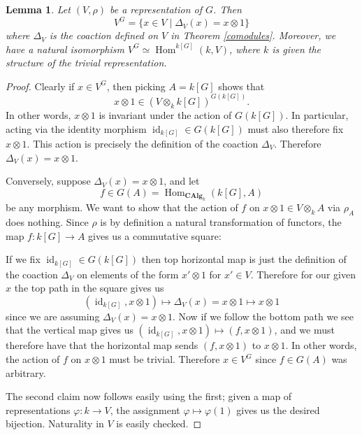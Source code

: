 \documentclass{article}
\theoremstyle{plain}
\newtheorem{Lemma}[Th]{Lemma}
\theoremstyle{definition}
\DeclareMathOperator{\id}{id}
\DeclareMathOperator{\Hom}{Hom}
\begin{document}
\begin{Lemma}\label{lemma:invariants-coinvariants}
    Let $(V, \rho)$ be a representation of $G$. Then 
    \[
    V^G=\{x\in V \mid \Delta_V(x)=x\otimes 1\}
    \]
    where $\Delta_V$ is the coaction defined on $V$ in Theorem \ref{comodules}. Moreover,  we have a natural isomorphism $V^G\simeq\Hom^{k[G]}(k, V)$, where $k$ is given the structure of the trivial representation.
\end{Lemma}
\begin{proof}
    Clearly if $x\in V^G$, then picking $A=k[G]$ shows that 
    \[
    x\otimes 1 \in (V\otimes_k k[G])^{G(k[G])}.
    \]
    In other words,  $x\otimes 1$ is invariant under the action of $G(k[G])$. In particular,  acting via the identity morphism $\id_{k[G]} \in G(k[G])$ must also therefore fix $x\otimes 1$. This action is precisely the definition of the coaction $\Delta_V$. Therefore $\Delta_V(x)=x\otimes 1$.

    Conversely, suppose $\Delta_V(x)=x\otimes 1$, and let 
    \[
    f\in G(A)=\Hom_{\textbf{CAlg}_k}(k[G], A)
    \]
    be any morphism. We want to show that the action of $f$ on $x \otimes 1 \in V\otimes_k A$ via $\rho_A$ does nothing. Since $\rho$ is by definition a natural transformation of functors, the map $f\colon k[G]\to A$ gives us a commutative square: 
    \begin{center}
    \end{center}
    If we fix $\id_{k[G]} \in G(k[G])$ then top horizontal map is just the definition of the coaction $\Delta_V$ on elements of the form $x'\otimes 1$ for $x'\in V$. Therefore for our given $x$ the top path in the square gives us 
    \[
    (\id_{k[G]}, x\otimes 1) \mapsto \Delta_V(x)=x\otimes 1 \mapsto x\otimes 1
    \]
     since we are assuming $\Delta_V(x)=x\otimes 1$. Now if we follow the bottom path we see that the vertical map gives us $(\id_{k[G]}, x\otimes 1) \mapsto (f, x\otimes 1)$, and we must therefore have that the horizontal map sends $ (f, x\otimes 1)$ to $x\otimes 1$. In other words, the action of $f$ on $x\otimes 1$ must be trivial. Therefore $x\in V^G$ since $f\in G(A)$ was arbitrary.
    
    The second claim now follows easily using the first; given a map of representations $\varphi\colon k\to V$, the assignment $\varphi\mapsto \varphi(1)$ gives us the desired bijection. Naturality in $V$ is easily checked.
\end{proof}
\end{document}
